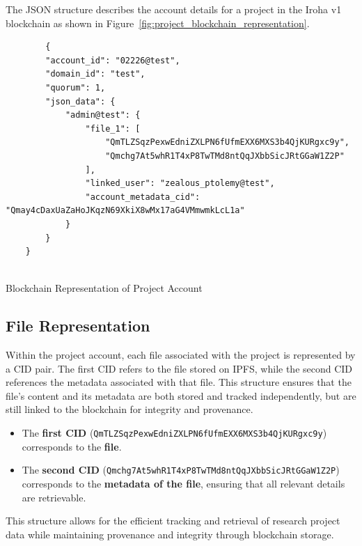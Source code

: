 \documentclass[final]{rc-book-2.14}
\begin{document}
The JSON structure describes the account details for a project in the Iroha v1 blockchain as shown in Figure~\ref{fig:project_blockchain_representation}.


\begin{listing}
\begin{verbatim}
        {
        "account_id": "02226@test",
        "domain_id": "test",
        "quorum": 1,
        "json_data": {
            "admin@test": {
                "file_1": [
                    "QmTLZSqzPexwEdniZXLPN6fUfmEXX6MXS3b4QjKURgxc9y",
                    "Qmchg7At5whR1T4xP8TwTMd8ntQqJXbbSicJRtGGaW1Z2P"
                ],
                "linked_user": "zealous_ptolemy@test",
                "account_metadata_cid": "Qmay4cDaxUaZaHoJKqzN69XkiX8wMx17aG4VMmwmkLcL1a"
            }
        }
    }
  
\end{verbatim}
\caption{Blockchain Representation of Project Account}
\label{fig:project_blockchain_representation}
\end{listing}



\subsection{File Representation}

Within the project account, each file associated with the project is represented by a CID pair. The first CID refers to the file stored on IPFS, while the second CID references the metadata associated with that file. This structure ensures that the file's content and its metadata are both stored and tracked independently, but are still linked to the blockchain for integrity and provenance.

\begin{itemize}
    \item The \textbf{first CID} (\texttt{QmTLZSqzPexwEdniZXLPN6fUfmEXX6MXS3b4QjKURgxc9y}) corresponds to the \textbf{file}.
    \item The \textbf{second CID} (\texttt{Qmchg7At5whR1T4xP8TwTMd8ntQqJXbbSicJRtGGaW1Z2P}) corresponds to the \textbf{metadata of the file}, ensuring that all relevant details are retrievable.
\end{itemize}

This structure allows for the efficient tracking and retrieval of research project data while maintaining provenance and integrity through blockchain storage.
\end{document}
